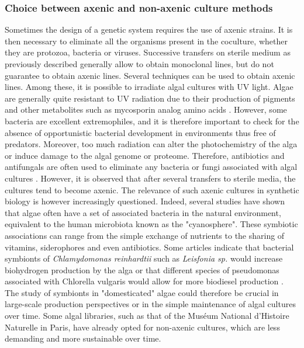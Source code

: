 \subsubsection{Choice between axenic and non-axenic culture methods}
Sometimes the design of a genetic system requires the use of axenic strains. It is then necessary to eliminate all the organisms present in the coculture, whether they are protozoa, bacteria or viruses. Successive transfers on sterile medium as previously described generally allow to obtain monoclonal lines, but do not guarantee to obtain axenic lines. Several techniques can be used to obtain axenic lines. Among these, it is possible to irradiate algal cultures with UV light. Algae are generally quite resistant to UV radiation due to their production of pigments and other metabolites such as mycosporin analog amino acids \parencite{Carreto2011}. However, some bacteria are excellent extremophiles, and it is therefore important to check for the absence of opportunistic bacterial development in environments thus free of predators. Moreover, too much radiation can alter the photochemistry of the alga or induce damage to the algal genome or proteome. Therefore, antibiotics and antifungals are often used to eliminate any bacteria or fungi associated with algal cultures \parencite{Richmond2013}. However, it is observed that after several transfers to sterile media, the cultures tend to become axenic. The relevance of such axenic cultures in synthetic biology is however increasingly questioned. Indeed, several studies have shown that algae often have a set of associated bacteria in the natural environment, equivalent to the human microbiota known as the "cyanosphere". These symbiotic associations can range from the simple exchange of nutrients to the sharing of vitamins, siderophores and even antibiotics. Some articles indicate that bacterial symbionts of \textit{Chlamydomonas reinhardtii} such as \textit{Leisfonia sp.} would increase biohydrogen production by the alga or that different species of pseudomonas associated with Chlorella vulgaris would allow for more biodiesel production \parencite{Yao2018}. The study of symbionts in "domesticated" algae could therefore be crucial in large-scale production perspectives or in the simple maintenance of algal cultures over time. Some algal libraries, such as that of the Muséum National d'Histoire Naturelle in Paris, have already opted for non-axenic cultures, which are less demanding and more sustainable over time.

